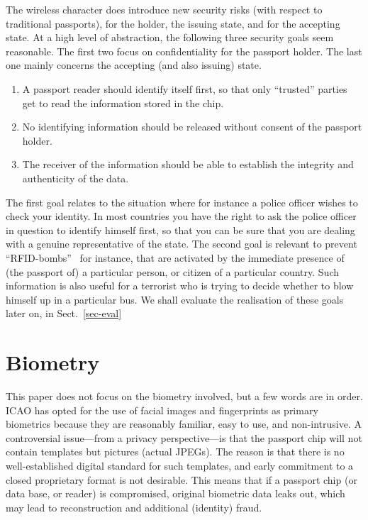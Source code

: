 \documentclass[runningheads,envcountsame,envcountsect,oribibl]{llncs}
\begin{document}
The wireless character does introduce new security risks
(with respect to traditional passports), for the holder, the issuing state, and for
the accepting state. At a high level of abstraction, the following
three security goals seem reasonable. The first two focus on 
confidentiality for the passport holder. The last one mainly
concerns the accepting (and also issuing) state.
\begin{enumerate}
\item A passport reader should identify 
itself first, so that only ``trusted'' parties get to read the
information stored in the chip.

\item No identifying information should be released without consent
of the passport holder.

\item The receiver of the information should be able to establish
the integrity and authenticity of the data.
\end{enumerate}

The first goal relates to the situation where for instance a police
officer wishes to check your identity. In most countries you have the
right to ask the police officer in question to identify himself first,
so that you can be sure that you are dealing with a genuine
representative of the state. The second goal is relevant to prevent
``RFID-bombs''~\cite{juels2005passports} for instance, that are
activated by the immediate presence of (the passport of) a particular
person, or citizen of a particular country. 
Such information is also useful for a
terrorist who is trying to decide whether to blow himself up in a
particular bus.  
We shall evaluate the realisation of these goals later on,
in Sect.~\ref{sec-eval}


\section{Biometry}
\label{sec-bio}

This paper does not focus on the biometry involved, but a few words
are in order. ICAO has opted for the use of facial images and
fingerprints as primary biometrics because they are reasonably
familiar, easy to use, and non-intrusive. A controversial issue---from
a privacy perspective---is that the passport chip will not contain
templates but pictures (actual JPEGs). The reason is that there is no
well-established digital standard for such templates, and early
commitment to a closed proprietary format is not desirable. This means
that if a passport chip (or data base, or reader) is compromised,
original biometric data leaks out, which may lead to reconstruction
and additional (identity) fraud.
\end{document}
